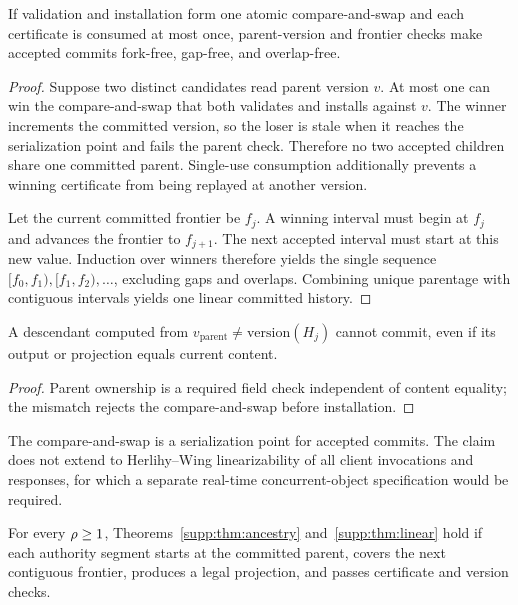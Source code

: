 \begin{theorem}\label{supp:thm:linear}
If validation and installation form one atomic compare-and-swap and each
certificate is consumed at most once, parent-version and frontier checks make
accepted commits fork-free, gap-free, and overlap-free.
\end{theorem}

\begin{proof}
Suppose two distinct candidates read parent version $v$. At most one can win
the compare-and-swap that both validates and installs against $v$. The winner
increments the committed version, so the loser is stale when it reaches the
serialization point and fails the parent check. Therefore no two accepted
children share one committed parent. Single-use consumption additionally
prevents a winning certificate from being replayed at another version.

Let the current committed frontier be $f_j$. A winning interval must begin at
$f_j$ and advances the frontier to $f_{j+1}$. The next accepted interval must
start at this new value. Induction over winners therefore yields the single
sequence $[f_0,f_1),[f_1,f_2),\ldots$, excluding gaps and overlaps. Combining
unique parentage with contiguous intervals yields one linear committed
history.
\end{proof}

\begin{corollary}
A descendant computed from $v_{\mathrm{parent}}\neq\mathrm{version}(H_j)$
cannot commit, even if its output or projection equals current content.
\end{corollary}

\begin{proof}
Parent ownership is a required field check independent of content equality;
the mismatch rejects the compare-and-swap before installation.
\end{proof}

\begin{remark}
The compare-and-swap is a serialization point for accepted commits. The claim
does not extend to Herlihy--Wing linearizability of all client invocations and
responses, for which a separate real-time concurrent-object specification
would be required.
\end{remark}

\begin{theorem}\label{supp:thm:granularity}
For every $\rho\geq1$, Theorems~\ref{supp:thm:ancestry}
and~\ref{supp:thm:linear} hold if each authority segment starts at the
committed parent, covers the next contiguous frontier, produces a legal
projection, and passes certificate and version checks.
\end{theorem}

